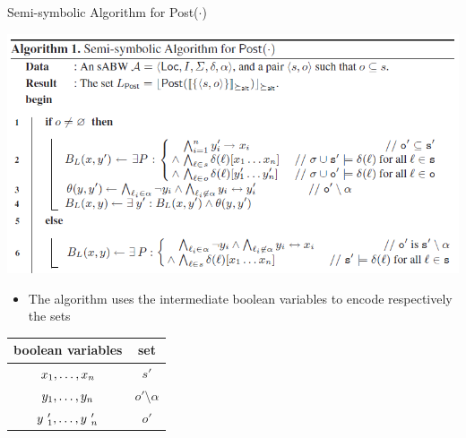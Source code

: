 \documentclass[12pt]{beamer}
\begin{document}
\begin{frame}{Semi-symbolic Algorithm for Post($\cdot$)}
	\label{Algorithm1_part1}
	\begin{center}
		\includegraphics[scale=0.5]{Algorithm1_part1}
	\end{center}
	\begin{minipage}{.5\textwidth}
		\begin{itemize}
			\item The algorithm uses the intermediate boolean variables to encode respectively the sets 
		\end{itemize}
	\end{minipage}%
	\begin{minipage}{.5\textwidth}
		\small
		\centering
		\begin{tabular}{ ||c|c|| } 
			\hline
			boolean variables & set \\
			\hline \hline
			$\mathnormal{x}_{1},\dots , \mathnormal{x}_\mathnormal{n}$ & $s'$ \\
			\hline 
			$\mathnormal{y}_{1},\dots , \mathnormal{y}_\mathnormal{n}$ & $o' \setminus \alpha$ \\ 
			\hline
			$\mathnormal{y}~'_{1},\dots , \mathnormal{y}~'_\mathnormal{n}$ & $o'$ \\ 
			\hline
		\end{tabular}
	\end{minipage}
\end{frame}
\end{document}
